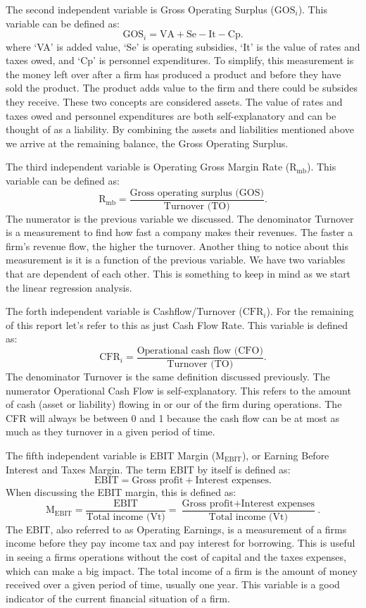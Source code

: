 \documentclass[12pt,letterpaper]{article}
\begin{document}
\setlength\parindent{24pt} The second independent variable is Gross Operating Surplus ($\text{GOS}_i$). This variable can be defined as: $$\text{GOS}_i=\text{VA}+\text{Se}-\text{It}-\text{Cp}.$$ where `VA' is added value, `Se' is operating subsidies, `It' is the value of rates and taxes owed, and `Cp' is personnel expenditures. To simplify, this measurement is the money left over after a firm has produced a product and before they have sold the product. The product adds value to the firm and there could be subsides they receive. These two concepts are considered assets. The value of rates and taxes owed and personnel expenditures are both self-explanatory and can be thought of as a liability. By combining the assets and liabilities mentioned above we arrive at the remaining balance, the Gross Operating Surplus.

\setlength\parindent{24pt} The third independent variable is Operating Gross Margin Rate ($\text{R}_{\text{mb}}$). This variable can be defined as: $$\text{R}_{\text{mb}}=\frac{\text{Gross operating surplus (GOS)}}{\text{Turnover (TO)}}.$$ The numerator is the previous variable we discussed. The denominator Turnover is a measurement to find how fast a company makes their revenues. The faster a firm's revenue flow, the higher the turnover. Another thing to notice about this measurement is it is a function of the previous variable. We have two variables that are dependent of each other. This is something to keep in mind as we start the linear regression analysis.

\setlength\parindent{24pt} The forth independent variable is Cashflow/Turnover ($\text{CFR}_i$). For the remaining of this report let's refer to this as just Cash Flow Rate. This variable is defined as: $$\text{CFR}_i=\frac{\text{Operational cash flow (CFO)}}{\text{Turnover (TO)}}.$$ The denominator Turnover is the same definition discussed previously. The numerator Operational Cash Flow is self-explanatory. This refers to the amount of cash (asset or liability) flowing in or our of the firm during operations. The CFR will always be between 0 and 1 because the cash flow can be at most as much as they turnover in a given period of time.

\setlength\parindent{24pt} The fifth independent variable is EBIT Margin ($\text{M}_{\text{EBIT}}$), or Earning Before Interest and Taxes Margin. The term EBIT by itself is defined as: $$\text{EBIT}=\text{Gross profit}+\text{Interest expenses}.$$ When discussing the EBIT margin, this is defined as: $$\text{M}_{\text{EBIT}}=\frac{\text{EBIT}}{\text{Total income (Vt)}}=\frac{\text{Gross profit}+\text{Interest expenses}}{\text{Total income (Vt)}}.$$ The EBIT, also referred to as Operating Earnings, is a measurement of a firms income before they pay income tax and pay interest for borrowing. This is useful in seeing a firms operations without the cost of capital and the taxes expenses, which can make a big impact. The total income of a firm is the amount of money received over a given period of time, usually one year. This variable is a good indicator of the current financial situation of a firm.
\end{document}
